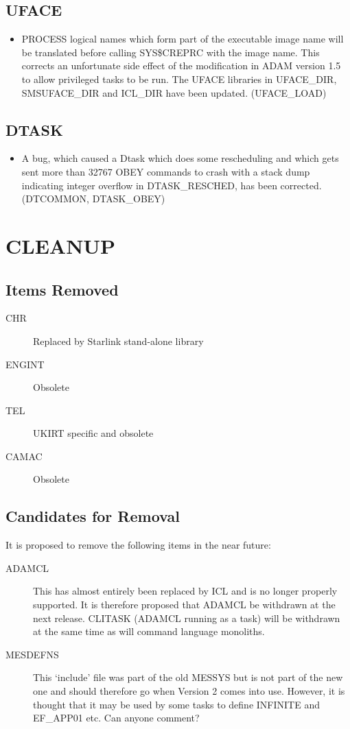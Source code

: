 \subsection{UFACE}
\begin{itemize}
\item PROCESS logical names which form part of the executable image name will
be translated before calling SYS\$CREPRC with the image name. 
This corrects an unfortunate side effect of the modification in ADAM version
1.5 to allow privileged tasks to be run.
The UFACE libraries in UFACE\_DIR, SMSUFACE\_DIR and ICL\_DIR have been 
updated. (UFACE\_LOAD)
\end{itemize}

\subsection{DTASK}
\label{dtask}
\begin{itemize}
\item A bug, which caused a Dtask which does some rescheduling and which gets
sent more than 32767 OBEY commands to crash with a stack dump indicating integer
overflow in DTASK\_RESCHED, has been corrected. (DTCOMMON, DTASK\_OBEY)
\end{itemize}

\section{CLEANUP}
\subsection{Items Removed}
\begin{description}
\item[CHR]         Replaced by Starlink stand-alone library
\item[ENGINT]      Obsolete
\item[TEL]         UKIRT specific and obsolete
\item[CAMAC]       Obsolete
\end{description}

\subsection{Candidates for Removal}
It is proposed to remove the following items in the near future:
\begin{description}
\item[ADAMCL] This has almost entirely been replaced by ICL and is no longer
properly supported.
It is therefore proposed that ADAMCL be withdrawn at the next release.
CLITASK (ADAMCL running as a task) will be withdrawn at the same time as will
command language monoliths.

\item[MESDEFNS] This `include' file was part of the old MESSYS but is not part
of the new one and should therefore go when Version 2 comes into use.
However, it is thought that it may be used by some tasks to define INFINITE
and EF\_APP01 etc.
Can anyone comment?
\end{description}


